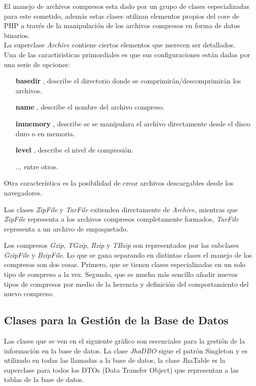 El manejo de archivos compresos esta dado por un grupo de clases especializadas para este cometido, adem\'as estas clases utilizan elementos propios del core de PHP a trav\'es de la manipulaci\'on de los archivos compresos en forma de datos binarios.\\

La superclase \textit{Archive} contiene ciertos elementos que merecen ser detallados.\\

Una de las caractiristicas primordiales es que sus configuraciones est\'an dadas por una serie de opciones:
\begin{itemize}
	\item[\textbf{basedir}], describe el directorio donde se comprimir\'an/descomprimir\'an los archivos.
	\item[\textbf{name}], describe el nombre del archivo compreso.
	\item[\textbf{inmemory}], describe se se manipulara el archivo directamente desde el disco duro o en memoria.
	\item[\textbf{level}], describe el nivel de compresi\'on.
	\item[...] entre otros.
\end{itemize}



Otra caracter\'istica es la posibilidad de crear archivos descargables desde los navegadores.



Las clases \emph{ZipFile} y \emph{TarFile} extienden directamente de \emph{Archive}, mientras que \emph{ZipFile} representa a los archivos compresos completamente formados, \emph{TarFile} representa a un archivo de empaquetado.





Los compresos \emph{Gzip}, \emph{TGzip}, \emph{Bzip} y \emph{TBzip} son representados por las subclases \emph{GzipFile} y \emph{BzipFile}. Lo que se gana separando en distintas clases el manejo de los compresos son dos cosas. Primero, que se tienen clases especializadas en un solo tipo de compreso a la vez. Segundo, que es mucho m\'as sencillo a\~nadir nuevos tipos de compresos por medio de la herencia y definici\'on del comportamiento del nuevo compreso.

\subsection{Clases para la Gesti\'on de la Base de Datos}
Las clases que se ven en el siguiente gr\'afico son escenciales para la gesti\'on de la informaci\'on en la base de datos. La clase \textit{JhaDBO} sigue el patr\'on Singleton y es utilizado en todas las llamadas a la base de datos, la clase JhaTable es la superclase para todos los DTOs (Data Transfer Object) que representan a las tablas de la base de datos.\\

